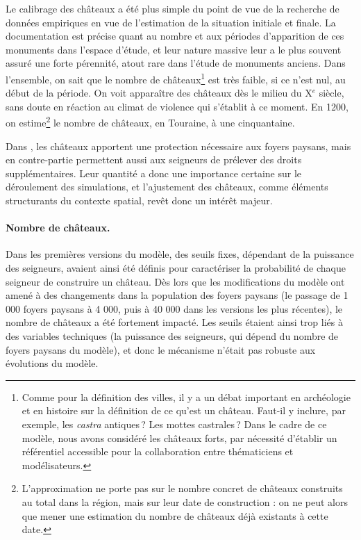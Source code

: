 Le calibrage des châteaux a été plus simple du point de vue de la recherche de données empiriques en vue de l'estimation de la situation initiale et finale.
La documentation est précise quant au nombre et aux périodes d'apparition de ces monuments dans l'espace d'étude, et leur nature massive leur a le plus souvent assuré une forte pérennité, atout rare dans l'étude de monuments anciens.
Dans l'ensemble, on sait que le nombre de châteaux\footnote{
	Comme pour la définition des villes, il y a un débat important en archéologie et en histoire sur la définition de ce qu'est un château.
	Faut-il y inclure, par exemple, les \textit{castra} antiques ? Les mottes castrales ?
	Dans le cadre de ce modèle, nous avons considéré les \og châteaux forts\fg{}, par nécessité d'établir un référentiel accessible pour la collaboration entre thématiciens et modélisateurs.
} est très faible, si ce n'est nul, au début de la période.
On voit apparaître des châteaux dès le milieu du X$^e$ siècle, sans doute en réaction au climat de violence qui s'établit à ce moment.
En 1200, on estime\footnote{
	L'approximation ne porte pas sur le nombre concret de châteaux construits au total dans la région, mais sur leur date de construction : on ne peut alors que mener une estimation du nombre de châteaux déjà existants à cette date.
} le nombre de châteaux, en Touraine, à une cinquantaine.

Dans \simfeodal{}, les châteaux apportent une protection nécessaire aux foyers paysans, mais en contre-partie permettent aussi aux seigneurs de prélever des droits supplémentaires.
Leur quantité a donc une importance certaine sur le déroulement des simulations, et l'ajustement des châteaux, comme éléments structurants du contexte spatial, revêt donc un intérêt majeur.

\paragraph{Nombre de châteaux.}
Dans les premières versions du modèle, des seuils fixes, dépendant de la puissance des seigneurs, avaient ainsi été définis pour caractériser la probabilité de chaque seigneur de construire un château.
Dès lors que les modifications du modèle ont amené à des changements dans la population des foyers paysans (le passage de 1 000 foyers paysans à 4 000, puis à 40 000 dans les versions les plus récentes), le nombre de châteaux a été fortement impacté.
Les seuils étaient ainsi trop liés à des variables techniques (la puissance des seigneurs, qui dépend du nombre de foyers paysans du modèle), et donc le mécanisme n'était pas robuste aux évolutions du modèle.

